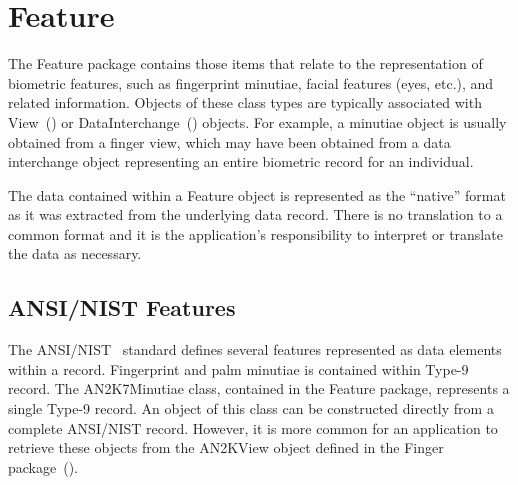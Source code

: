 %
%
\chapter{Feature}
\label{chp-feature}
The Feature package contains those items that relate to the representation of
biometric features, such as fingerprint minutiae, facial features (eyes, etc.),
and related information. Objects of these class types are typically associated
with View~() or
DataInterchange~()
objects. For example, a minutiae object is usually obtained from a finger view,
which may have been obtained from a data interchange object representing an
entire biometric record for an individual.

The data contained within a Feature object is represented as the ``native''
format as it was extracted from the underlying data record. There is no
translation to a common format and it is the application's responsibility to
interpret or translate the data as necessary.

\section{ANSI/NIST Features}
\label{sec-ansinistfeatures}
The ANSI/NIST~\cite{std:an2k} standard defines several features represented
as data elements within a record. Fingerprint and palm minutiae is contained
within Type-9 record. The AN2K7Minutiae class, contained in the Feature
package, represents a single Type-9 record. An object of this class can be
constructed directly from a complete ANSI/NIST record. However, it is more
common for an application to retrieve these objects from the AN2KView object
defined in the Finger package~().
